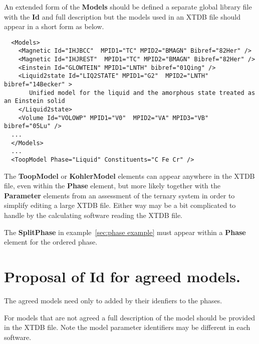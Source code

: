 \documentclass{article}
\begin{document}
\begin{appendices}
An extended form of the {\bf Models} should be defined a separate
global library file with the {\bf Id} and full description but the
models used in an XTDB file should appear in a short form as below.

{\small
\begin{verbatim}
  <Models>
    <Magnetic Id="IHJBCC"  MPID1="TC" MPID2="BMAGN" Bibref="82Her" />
    <Magnetic Id="IHJREST"  MPID1="TC" MPID2="BMAGN" Bibref="82Her" />
    <Einstein Id="GLOWTEIN" MPID1="LNTH" bibref="01Qing" /> 
    <Liquid2state Id="LIQ2STATE" MPID1="G2"  MPID2="LNTH" bibref="14Becker" >
       Unified model for the liquid and the amorphous state treated as an Einstein solid
    </Liquid2state>
    <Volume Id="VOLOWP" MPID1="V0"  MPID2="VA" MPID3="VB" bibref="05Lu" />
  ...
  </Models>
  ...
  <ToopModel Phase="Liquid" Constituents="C Fe Cr" />
\end{verbatim}
}

The {\bf ToopModel} or {\bf KohlerModel} elements can appear anywhere
in the XTDB file, even within the {\bf Phase} element, but more likely
together with the {\bf Parameter} elements from an assessment of the
ternary system in order to simplify editing a large XTDB file.  Either
way may be a bit complicated to handle by the calculating software
reading the XTDB file.

The {\bf SplitPhase} in example~\ref{sec:phase example} must appear
within a {\bf Phase} element for the ordered phase.

\newpage
\setcounter{equation}{0}
\renewcommand{\theequation}{B\arabic{equation}}
\setcounter{figure}{0}
\renewcommand{\thefigure}{B\arabic{figure}}

\section{Proposal of Id for agreed models.}\label{sec:modelapp}

The agreed models need only to added by their idenfiers to the phases.

For models that are not agreed a full description of the model should
be provided in the XTDB file.  Note the model parameter identifiers
may be different in each software.


\end{appendices}
\end{document}
